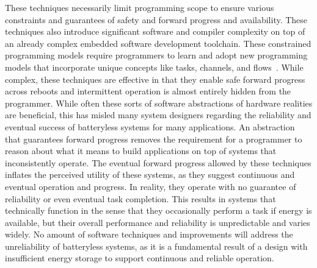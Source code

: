 These techniques necessarily limit programming scope to ensure various constraints and guarantees of safety and forward progress and availability.
These techniques also introduce significant software and compiler complexity on top of an already complex embedded software development toolchain.
These constrained programming models require programmers to learn and adopt new programming models that incorporate unique concepts like tasks, channels, and flows~\cite{colin2016chain,maeng2017alpaca,hesterTimely17}.
While complex, these techniques are effective in that they enable safe forward progress across reboots and intermittent operation is almost entirely hidden from the programmer.
While often these sorts of software abstractions of hardware realities are beneficial, this has misled many system designers regarding the reliability and eventual success of batteryless systems for many applications.
An abstraction that guarantees forward progress removes the requirement for a programmer to
reason about what it means to build applications on top of systems that inconsistently operate.
The eventual forward progress allowed by these techniques inflates the perceived utility of these systems,
as they suggest continuous and eventual operation and progress. In reality, they operate with no guarantee of reliability or even eventual task completion.
This results in systems that technically function in the sense that they occasionally perform a task if energy is available, but their overall performance and reliability is unpredictable and varies widely.
No amount of software techniques and improvements will address the unreliability of batteryless systems, as it is a fundamental result of a design with insufficient energy storage to support continuous and reliable operation.

